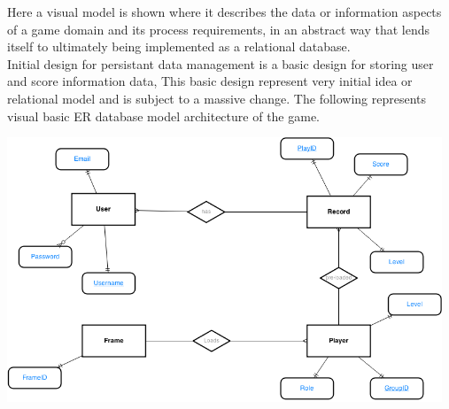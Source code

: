 Here a visual model is shown where it describes the data or information aspects of a game domain and its process requirements, in an abstract way that lends itself to ultimately being implemented as a relational database. \\


Initial design for persistant data management is a basic design for storing user and score information data, This basic design represent very initial idea or relational model and is subject to a massive change. The following represents visual basic ER database model architecture of the game.\\

\begin{center}
	 \includegraphics[width=130mm]{./images/ER.png}

\end{center}


